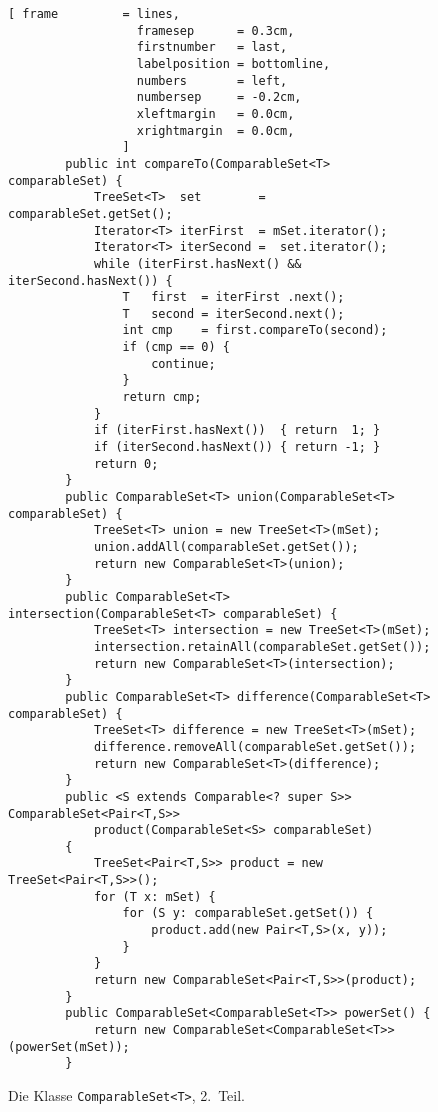 \begin{figure}[!h]
\centering
\begin{Verbatim}[ frame         = lines, 
                  framesep      = 0.3cm, 
                  firstnumber   = last,
                  labelposition = bottomline,
                  numbers       = left,
                  numbersep     = -0.2cm,
                  xleftmargin   = 0.0cm,
                  xrightmargin  = 0.0cm,
                ]
        public int compareTo(ComparableSet<T> comparableSet) {
            TreeSet<T>  set        = comparableSet.getSet();
            Iterator<T> iterFirst  = mSet.iterator();
            Iterator<T> iterSecond =  set.iterator();
            while (iterFirst.hasNext() && iterSecond.hasNext()) {
                T   first  = iterFirst .next();
                T   second = iterSecond.next();
                int cmp    = first.compareTo(second);
                if (cmp == 0) {
                    continue;
                }
                return cmp;
            }
            if (iterFirst.hasNext())  { return  1; }       
            if (iterSecond.hasNext()) { return -1; }
            return 0;
        }
        public ComparableSet<T> union(ComparableSet<T> comparableSet) {
            TreeSet<T> union = new TreeSet<T>(mSet);
            union.addAll(comparableSet.getSet());
            return new ComparableSet<T>(union);
        }    
        public ComparableSet<T> intersection(ComparableSet<T> comparableSet) {
            TreeSet<T> intersection = new TreeSet<T>(mSet);
            intersection.retainAll(comparableSet.getSet());
            return new ComparableSet<T>(intersection);
        }    
        public ComparableSet<T> difference(ComparableSet<T> comparableSet) {
            TreeSet<T> difference = new TreeSet<T>(mSet);
            difference.removeAll(comparableSet.getSet());
            return new ComparableSet<T>(difference);
        }
        public <S extends Comparable<? super S>> ComparableSet<Pair<T,S>>
            product(ComparableSet<S> comparableSet) 
        {
            TreeSet<Pair<T,S>> product = new TreeSet<Pair<T,S>>();
            for (T x: mSet) {
                for (S y: comparableSet.getSet()) {
                    product.add(new Pair<T,S>(x, y));
                }
            }       
            return new ComparableSet<Pair<T,S>>(product);
        }
        public ComparableSet<ComparableSet<T>> powerSet() {
            return new ComparableSet<ComparableSet<T>>(powerSet(mSet));
        }   
    \end{Verbatim}
\vspace*{-0.3cm}
\caption{Die Klasse \texttt{ComparableSet<T>}, 2.~Teil.}
\label{fig:ComparableSet-2}
\end{figure}

